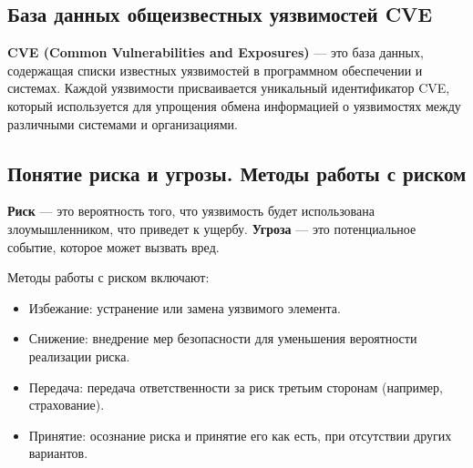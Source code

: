 \subsection*{База данных общеизвестных уязвимостей CVE}

\textbf{CVE (Common Vulnerabilities and Exposures)} --- это база данных,
содержащая списки известных уязвимостей в программном обеспечении и системах.
Каждой уязвимости присваивается уникальный идентификатор CVE,
который используется
для упрощения обмена информацией о уязвимостях между различными системами и организациями.

\subsection*{Понятие риска и угрозы. Методы работы с риском}

\textbf{Риск} --- это вероятность того,
что уязвимость будет использована злоумышленником, что приведет к ущербу.
\textbf{Угроза} --- это потенциальное событие, которое может вызвать вред.

Методы работы с риском включают:

\begin{itemize}
	\item Избежание: устранение или замена уязвимого элемента.
	\item Снижение:
		внедрение мер безопасности для уменьшения вероятности реализации риска.
	\item Передача:
		передача ответственности за риск третьим сторонам (например, страхование).
	\item Принятие:
		осознание риска и принятие его как есть, при отсутствии других вариантов.
\end{itemize}

